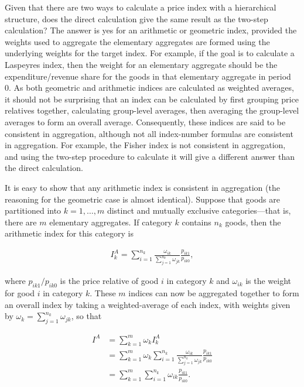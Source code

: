 \documentclass[]{article}
\begin{document}
Given that there are two ways to calculate a price index with a hierarchical structure, does the direct calculation give the same result as the two-step calculation? The answer is yes for an arithmetic or geometric index, provided the weights used to aggregate the elementary aggregates are formed using the underlying weights for the target index. For example, if the goal is to calculate a Laspeyres index, then the weight for an elementary aggregate should be the expenditure/revenue share for the goods in that elementary aggregate in period 0. As both geometric and arithmetic indices are calculated as weighted averages, it should not be surprising that an index can be calculated by first grouping price relatives together, calculating group-level averages, then averaging the group-level averages to form an overall average. Consequently, these indices are said to be consistent in aggregation, although not all index-number formulas are consistent in aggregation. For example, the Fisher index is not consistent in aggregation, and using the two-step procedure to calculate it will give a different answer than the direct calculation.

It is easy to show that any arithmetic index is consistent in aggregation (the reasoning for the geometric case is almost identical). Suppose that goods are partitioned into \(k=1,\ldots,m\) distinct and mutually exclusive categories---that is, there are \(m\) elementary aggregates. If category \(k\) contains \(n_{k}\) goods, then the arithmetic index for this category is

\begin{align*}
I_{k}^{A} = \sum_{i = 1}^{n_k} \frac{\omega_{ik}}{\sum_{j = 1}^{n_k} \omega_{jk}} \frac{p_{ik1}}{p_{ik0}},
\end{align*}

where \(p_{ik1} / p_{ik0}\) is the price relative of good \(i\) in category \(k\) and \(\omega_{ik}\) is the weight for good \(i\) in category \(k\). These \(m\) indices can now be aggregated together to form an overall index by taking a weighted-average of each index, with weights given by \(\omega_{k} = \sum_{j = 1}^{n_k} \omega_{jk}\), so that

\begin{align*}
I^{A} &= \sum_{k = 1}^{m} \omega_k I_{k}^{A}  \\
&= \sum_{k = 1}^{m} \omega_k \sum_{i = 1}^{n_k} \frac{\omega_{ik}}{\sum_{j = 1}^{n_k} \omega_{jk}} \frac{p_{ik1}}{p_{ik0}} \\
&= \sum_{k = 1}^{m} \sum_{i = 1}^{n_k} \omega_{ik} \frac{p_{ik1}}{p_{ik0}}.
\end{align*}
\end{document}

